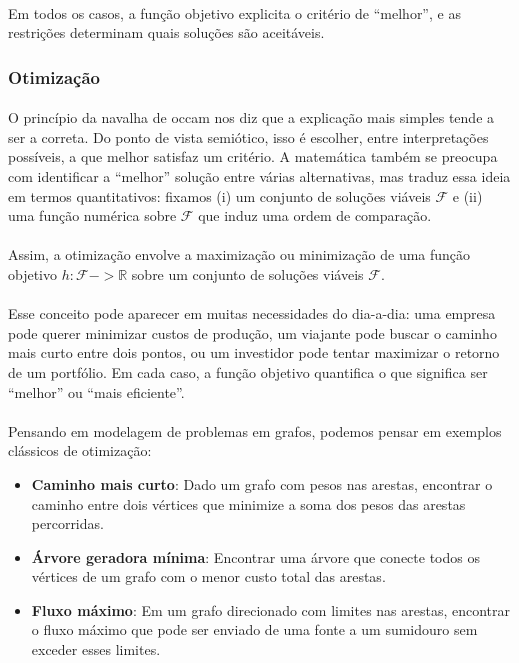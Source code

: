 \documentclass[12pt,a4paper]{article}
\def\to{->}%
\begin{document}
\paragraph{}
Em todos os casos, a função objetivo explicita o critério de “melhor”, e as restrições determinam quais soluções são aceitáveis.

\subsubsection{Otimização}
\paragraph{}
O princípio da navalha de occam nos diz que a explicação mais simples tende a ser a correta. Do ponto de vista semiótico, isso é escolher, entre interpretações possíveis, a que melhor satisfaz um critério. A matemática também se preocupa com identificar a “melhor” solução entre várias alternativas, mas traduz essa ideia em termos quantitativos: fixamos (i) um conjunto de soluções viáveis \(\mathcal{F}\) e (ii) uma função numérica sobre \(\mathcal{F}\) que induz uma ordem de comparação. 

\paragraph{}
Assim, a otimização envolve a maximização ou minimização de uma função objetivo \(h: \mathcal{F} \to \mathbb{R}\) sobre um conjunto de soluções viáveis \(\mathcal{F}\).

\paragraph{}
Esse conceito pode aparecer em muitas necessidades do dia-a-dia: uma empresa pode querer minimizar custos de produção, um viajante pode buscar o caminho mais curto entre dois pontos, ou um investidor pode tentar maximizar o retorno de um portfólio. Em cada caso, a função objetivo quantifica o que significa ser “melhor” ou “mais eficiente”.

\paragraph{}
Pensando em modelagem de problemas em grafos, podemos pensar em exemplos clássicos de otimização:

\begin{itemize}
    \item \textbf{Caminho mais curto}: Dado um grafo com pesos nas arestas, encontrar o caminho entre dois vértices que minimize a soma dos pesos das arestas percorridas.
    \item \textbf{Árvore geradora mínima}: Encontrar uma árvore que conecte todos os vértices de um grafo com o menor custo total das arestas.
    \item \textbf{Fluxo máximo}: Em um grafo direcionado com limites nas arestas, encontrar o fluxo máximo que pode ser enviado de uma fonte a um sumidouro sem exceder esses limites.
\end{itemize}
\end{document}
